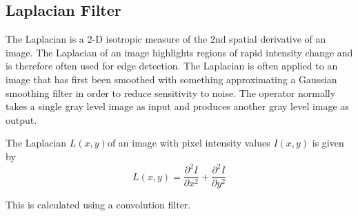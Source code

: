 \documentclass[conference]{IEEEtran}
\begin{document}


\subsection{Laplacian Filter}
The Laplacian is a 2-D isotropic measure of the 2nd spatial derivative of an image. The Laplacian of an image highlights regions of rapid intensity change and is therefore often used for edge detection. The Laplacian is often applied to an image that has first been smoothed with something approximating a Gaussian smoothing filter in order to reduce sensitivity to noise. The operator normally takes a single gray level image as input and produces another gray level image as output.

The Laplacian \begin{math} L(x,y)\end{math}of an image with pixel intensity values \begin{math}I(x,y)\end{math} is given by 
\begin{equation}
L(x,y) = \frac{\partial^2 I}{\partial x^2} + \frac{\partial^2 I}{\partial y^2}
\end{equation} 

This is calculated using a convolution filter.
\end{document}
